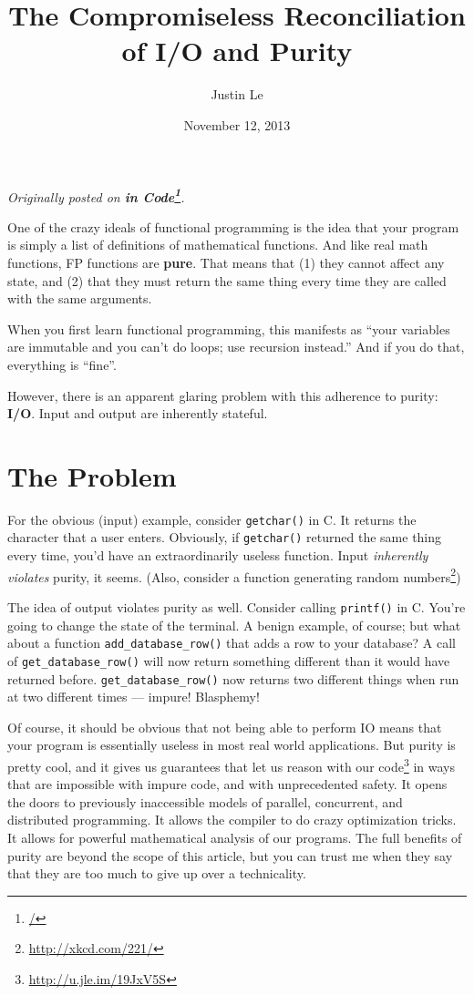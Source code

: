 \documentclass[]{article}
\title{The Compromiseless Reconciliation of I/O and Purity}
\author{Justin Le}
\date{November 12, 2013}
\renewcommand{\href}[2]{#2\footnote{\url{#1}}}
\begin{document}
\maketitle

\emph{Originally posted on \textbf{\href{/}{in Code}}.}

One of the crazy ideals of functional programming is the idea that your
program is simply a list of definitions of mathematical functions. And
like real math functions, FP functions are \textbf{pure}. That means
that (1) they cannot affect any state, and (2) that they must return the
same thing every time they are called with the same arguments.

When you first learn functional programming, this manifests as ``your
variables are immutable and you can't do loops; use recursion instead.''
And if you do that, everything is ``fine''.

However, there is an apparent glaring problem with this adherence to
purity: \textbf{I/O}. Input and output are inherently stateful.

\section{The Problem}\label{the-problem}

For the obvious (input) example, consider \texttt{getchar()} in C. It
returns the character that a user enters. Obviously, if
\texttt{getchar()} returned the same thing every time, you'd have an
extraordinarily useless function. Input \emph{inherently violates}
purity, it seems. (Also, consider a \href{http://xkcd.com/221/}{function
generating random numbers})

The idea of output violates purity as well. Consider calling
\texttt{printf()} in C. You're going to change the state of the
terminal. A benign example, of course; but what about a function
\texttt{add\_database\_row()} that adds a row to your database? A call
of \texttt{get\_database\_row()} will now return something different
than it would have returned before. \texttt{get\_database\_row()} now
returns two different things when run at two different times --- impure!
Blasphemy!

Of course, it should be obvious that not being able to perform IO means
that your program is essentially useless in most real world
applications. But purity is pretty cool, and it gives us guarantees that
let us \href{http://u.jle.im/19JxV5S}{reason with our code} in ways that
are impossible with impure code, and with unprecedented safety. It opens
the doors to previously inaccessible models of parallel, concurrent, and
distributed programming. It allows the compiler to do crazy optimization
tricks. It allows for powerful mathematical analysis of our programs.
The full benefits of purity are beyond the scope of this article, but
you can trust me when they say that they are too much to give up over a
technicality.
\end{document}
